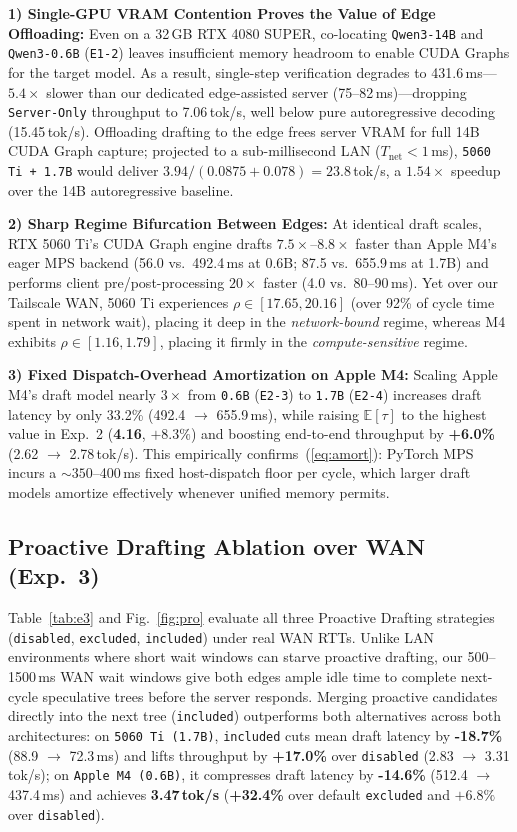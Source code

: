 \documentclass[10pt,conference]{IEEEtran}
\begin{document}
\textbf{1) Single-GPU VRAM Contention Proves the Value of Edge Offloading:} Even on a 32\,GB RTX 4080 SUPER, co-locating \texttt{Qwen3-14B} and \texttt{Qwen3-0.6B} (\texttt{E1-2}) leaves insufficient memory headroom to enable CUDA Graphs for the target model. As a result, single-step verification degrades to 431.6\,ms---$5.4\times$ slower than our dedicated edge-assisted server (75--82\,ms)---dropping \texttt{Server-Only} throughput to 7.06\,tok/s, well below pure autoregressive decoding (15.45\,tok/s). Offloading drafting to the edge frees server VRAM for full 14B CUDA Graph capture; projected to a sub-millisecond LAN ($T_{\mathrm{net}} < 1$\,ms), \texttt{5060 Ti + 1.7B} would deliver $3.94 / (0.0875 + 0.078) = 23.8$\,tok/s, a $1.54\times$ speedup over the 14B autoregressive baseline.

\textbf{2) Sharp Regime Bifurcation Between Edges:} At identical draft scales, RTX 5060 Ti's CUDA Graph engine drafts $7.5\times$--$8.8\times$ faster than Apple M4's eager MPS backend (56.0 vs.\ 492.4\,ms at 0.6B; 87.5 vs.\ 655.9\,ms at 1.7B) and performs client pre/post-processing $20\times$ faster (4.0 vs.\ 80--90\,ms). Yet over our Tailscale WAN, 5060 Ti experiences $\rho \in [17.65, 20.16]$ (over 92\% of cycle time spent in network wait), placing it deep in the \emph{network-bound} regime, whereas M4 exhibits $\rho \in [1.16, 1.79]$, placing it firmly in the \emph{compute-sensitive} regime.

\textbf{3) Fixed Dispatch-Overhead Amortization on Apple M4:} Scaling Apple M4's draft model nearly $3\times$ from \texttt{0.6B} (\texttt{E2-3}) to \texttt{1.7B} (\texttt{E2-4}) increases draft latency by only 33.2\% (492.4 $\to$ 655.9\,ms), while raising $\mathbb{E}[\tau]$ to the highest value in Exp.\ 2 (\textbf{4.16}, $+8.3\%$) and boosting end-to-end throughput by \textbf{+6.0\%} (2.62 $\to$ 2.78\,tok/s). This empirically confirms~(\ref{eq:amort}): PyTorch MPS incurs a $\sim 350$--400\,ms fixed host-dispatch floor per cycle, which larger draft models amortize effectively whenever unified memory permits.

\subsection{Proactive Drafting Ablation over WAN (Exp.\ 3)}

Table~\ref{tab:e3} and Fig.~\ref{fig:pro} evaluate all three Proactive Drafting strategies (\texttt{disabled}, \texttt{excluded}, \texttt{included}) under real WAN RTTs. Unlike LAN environments where short wait windows can starve proactive drafting, our 500--1500\,ms WAN wait windows give both edges ample idle time to complete next-cycle speculative trees before the server responds. Merging proactive candidates directly into the next tree (\texttt{included}) outperforms both alternatives across both architectures: on \texttt{5060 Ti (1.7B)}, \texttt{included} cuts mean draft latency by \textbf{-18.7\%} (88.9 $\to$ 72.3\,ms) and lifts throughput by \textbf{+17.0\%} over \texttt{disabled} (2.83 $\to$ 3.31\,tok/s); on \texttt{Apple M4 (0.6B)}, it compresses draft latency by \textbf{-14.6\%} (512.4 $\to$ 437.4\,ms) and achieves \textbf{3.47\,tok/s} (\textbf{+32.4\%} over default \texttt{excluded} and $+6.8\%$ over \texttt{disabled}).
\end{document}
